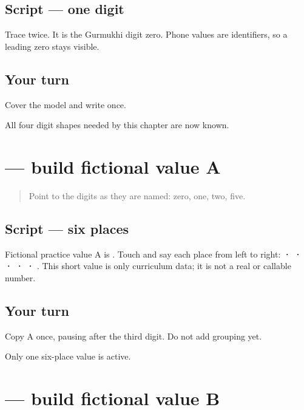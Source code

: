 \subsection*{Script — one digit}
Trace \textbf{} twice. It is the Gurmukhi digit zero. Phone values are identifiers, so a leading zero stays visible.

\subsection*{Your turn}
Cover the model and write \textbf{} once.

\begin{tcolorbox}[breakable,colback=teal!4,colframe=teal!35!black,title={Before you move on}]
All four digit shapes needed by this chapter are now known.
\end{tcolorbox}
\section[\texorpdfstring{\pa{੦੧੨੨੫੧} (zero-one-two-two-five-one)}{੦੧੨੨੫੧ (zero-one-two-two-five-one)}]{ — build fictional value A}

\label{lesson:PA-W08-phone-a}



\begin{quote}
Point to the digits as they are named: zero, one, two, five.
\end{quote}

\subsection*{Script — six places}
Fictional practice value A is \textbf{}. Touch and say each place from left to right: \textbf{ ·  ·  ·  ·  · }. This short value is only curriculum data; it is not a real or callable number.

\subsection*{Your turn}
Copy A once, pausing after the third digit. Do not add grouping yet.

\begin{tcolorbox}[breakable,colback=teal!4,colframe=teal!35!black,title={Before you move on}]
Only one six-place value is active.
\end{tcolorbox}
\section[\texorpdfstring{\pa{੦੨੫੧੨੫} (zero-two-five-one-two-five)}{੦੨੫੧੨੫ (zero-two-five-one-two-five)}]{ — build fictional value B}

